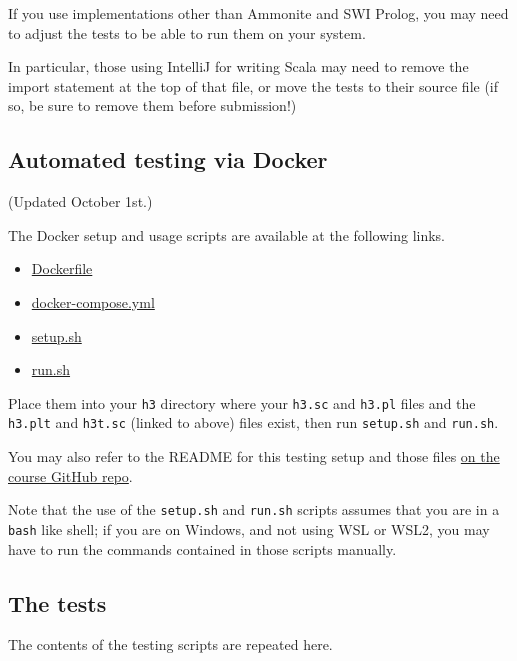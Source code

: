 \documentclass[11pt]{article}
\begin{document}
If you use implementations other than Ammonite and SWI Prolog,
you may need to adjust the tests to be able to run them
on your system.

In particular, those using IntelliJ for writing Scala
may need to remove the import statement at the top of that file,
or move the tests to their source file
(if so, be sure to remove them before submission!)

\subsection*{Automated testing via Docker}
\label{sec:org1f6b498}
(Updated October 1st.)

The Docker setup and usage scripts are available at the following links.
\begin{itemize}
\item \href{./testing/h3/Dockerfile}{Dockerfile}
\item \href{./testing/h3/docker-compose.yml}{docker-compose.yml}
\item \href{./testing/h3/setup.sh}{setup.sh}
\item \href{./testing/h3/run.sh}{run.sh}
\end{itemize}
Place them into your \texttt{h3} directory where your \texttt{h3.sc} and \texttt{h3.pl} files
and the \texttt{h3.plt} and \texttt{h3t.sc} (linked to above) files exist,
then run \texttt{setup.sh} and \texttt{run.sh}.

You may also refer to the README
for this testing setup and those files
\href{https://github.com/armkeh/principles-of-programming-languages/tree/master/homework/testing/h3}{on the course GitHub repo}.

Note that the use of the \texttt{setup.sh} and \texttt{run.sh} scripts assumes
that you are in a \texttt{bash} like shell; if you are on Windows,
and not using WSL or WSL2, you may have
to run the commands contained in those scripts manually.

\subsection*{The tests}
\label{sec:orgc45792a}
The contents of the testing scripts are repeated here.
\end{document}
